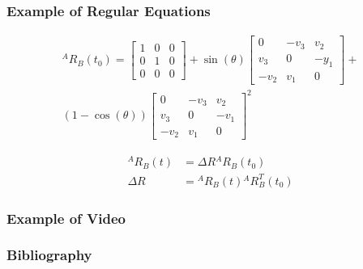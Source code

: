 \documentclass[10pt]{beamer}
\theoremstyle{remark}
\theoremstyle{definition}
\begin{document}
\begin{frame}[allowframebreaks]
\frametitle{Example of Regular Equations}
    
    
    \begin{equation}
        \begin{split}
        {}^AR_{B}(t_0)=\left[\begin{array}{ccc}
        1 & 0 & 0 \\
        0 & 1 & 0 \\
        0 & 0 & 0
        \end{array}\right]+
        \sin (\theta)\left[\begin{array}{ccc}
        0 & -v_{3} & v_{2} \\
        v_{3} & 0 & -y_{1} \\
        -v_{2} & v_{1} & 0
        \end{array}\right]+ \\
        (1-\cos (\theta))\left[\begin{array}{ccc}
        0 & -v_{3} & v_{2} \\
        v_{3} & 0 & -v_{1} \\
        -v_{2} & v_{1} & 0
        \end{array}\right]^{2}
        \end{split}
        \end{equation}
        
        \begin{align}
            {}^AR_{B}(t) &= \Delta R {}^AR_{B}(t_0) \\
            \Delta R &= {}^AR_{B}(t) {}^AR_{B}^T(t_0)
        \end{align}
\end{frame}

\begin{frame}[allowframebreaks]
\frametitle{Example of Video}

    
\end{frame}

\begin{frame}[allowframebreaks]
\frametitle{Bibliography}
\printbibliography
\end{frame}
\end{document}
